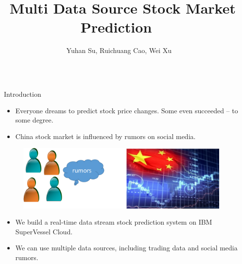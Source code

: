\documentclass[final,hyperref={pdfpagelabels=false}]{beamer}
\title{\huge  ~\vspace{10mm} \newline  Multi Data Source Stock Market Prediction}
\author{\huge~\vspace{10mm} \newline  Yuhan Su, Ruichuang Cao, Wei Xu} %
\institute{\huge Tsinghua University} %
\begin{document}
\linespread{0.98}	

\begin{frame}[t] %

\begin{columns}[t] %

\begin{column}{.03\textwidth}\end{column} %

\begin{column}{.445\textwidth} %


\begin{block}{Introduction}
\begin{itemize}	
\item Everyone dreams to predict stock price changes. Some even succeeded -- to some degree. 
\item China stock market is influenced by rumors on social media.
\end{itemize}
\centering
\begin{figure}
	\includegraphics[width=0.6\linewidth]{intro.png}
	\label{intro}
\end{figure}
\begin{itemize}
\item We build a real-time data stream stock prediction system on IBM SuperVessel Cloud.  
\item We can use multiple data sources, including trading data and social media rumors. 

\end{itemize}
\end{block}


\end{column}
\end{columns}
\end{frame}
\end{document}
